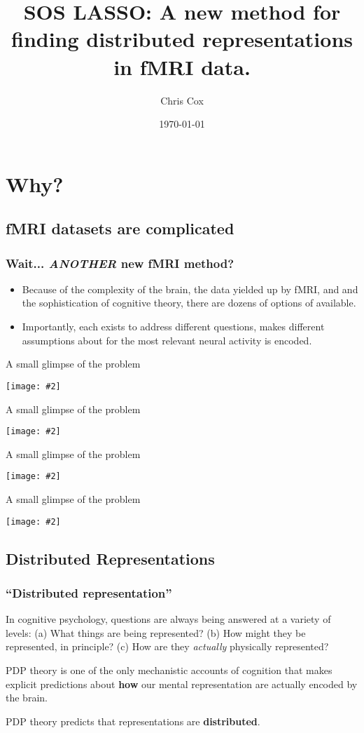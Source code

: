 \documentclass{beamer}
\title[SOS LASSO]{SOS LASSO: A new method for finding distributed representations in fMRI data.}
\author{Chris Cox}
\institute{University of Wisconsin, Madison}
\date{\today}
\newcommand {\framedgraphic}[2] {
    \begin{frame}{#1}
        \begin{center}
            \texttt{[image: \#2]}
        \end{center}
    \end{frame}
}
\begin{document}
\begin{frame}
\titlepage
\end{frame}


\section{Why?}
\subsection{fMRI datasets are complicated}
\begin{frame}
\frametitle{Wait... {\em ANOTHER} new fMRI method?}
\begin{itemize}
\item Because of the complexity of the brain, the data yielded up by fMRI, and and the sophistication of cognitive theory, there are dozens of options of available.
\pause
\item Importantly, each exists to address different questions, makes different assumptions about for the most relevant neural activity is encoded.
\end{itemize}
\end{frame}


\framedgraphic{A small glimpse of the problem}{data_demo_1.pdf}
\framedgraphic{A small glimpse of the problem}{data_demo_2.pdf}
\framedgraphic{A small glimpse of the problem}{data_demo_3.pdf}
\framedgraphic{A small glimpse of the problem}{data_demo_4.pdf}

\subsection{Distributed Representations}
\begin{frame}
\frametitle{``Distributed representation''}
In cognitive psychology, questions are always being answered at a variety of levels: \pause (a) What things are being represented? \pause (b) How might they be represented, in principle? \pause (c) How are they {\em actually} physically represented? 

PDP theory is one of the only mechanistic accounts of cognition that makes explicit predictions about {\bf how} our mental representation are actually encoded by the brain. 

PDP theory predicts that representations are {\bf distributed}.
\end{frame}
\end{document}
